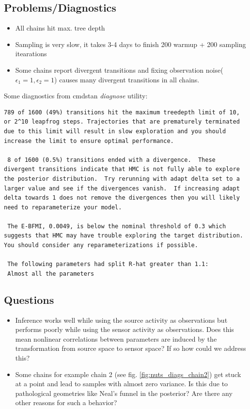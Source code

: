 \documentclass[12pt]{article}
\begin{document}
 \clearpage
 \subsection*{Problems/Diagnostics} 
 \begin{itemize}
 \item All chains hit max. tree depth
 \item Sampling is very slow, it takes 3-4 days to finish 200 warmup + 200 sampling itearations
 \item Some chains report divergent transitions and fixing observation noise($\epsilon_1=1, \epsilon_2=1$) causes many divergent transitions in all chains.
 \end{itemize}
 

 Some diagnostics from cmdstan \textit{diagnose} utility:

\begin{lstlisting}[breaklines]
 789 of 1600 (49%) transitions hit the maximum treedepth limit of 10, or 2^10 leapfrog steps. Trajectories that are prematurely terminated due to this limit will result in slow exploration and you should increase the limit to ensure optimal performance.

 8 of 1600 (0.5%) transitions ended with a divergence.  These divergent transitions indicate that HMC is not fully able to explore the posterior distribution.  Try rerunning with adapt delta set to a larger value and see if the divergences vanish.  If increasing adapt delta towards 1 does not remove the divergences then you will likely need to reparameterize your model.

 The E-BFMI, 0.0049, is below the nominal threshold of 0.3 which suggests that HMC may have trouble exploring the target distribution.  You should consider any reparameterizations if possible.

 The following parameters had split R-hat greater than 1.1:
 Almost all the parameters
\end{lstlisting}

 \clearpage
 \subsection*{Questions}
 \begin{itemize}
 \item Inference works well while using the source activity as observations but performs poorly while using the sensor activity as observations. Does this mean nonlinear correlations between parameters are induced by the transformation from source space to sensor space? If so how could we address this?
 \item Some chains for example chain 2 (see fig. \ref{fig:nuts_diags_chain2}) get stuck at a point and lead to samples with almost zero variance. Is this due to pathological geometries like Neal's funnel in the posterior? Are there any other reasons for such a behavior? 
 \end{itemize}

 
 
\end{document}
